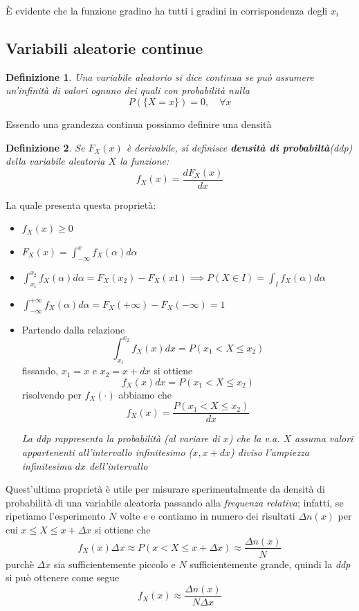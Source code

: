 \documentclass[11pt,a4paper]{article}
\newtheorem{definition}{Definizione}[section]
\begin{document}
È evidente che la funzione gradino ha tutti i gradini in corrispondenza degli $x_i$
\subsection{Variabili aleatorie continue}\label{sub:Variabili aleatorie continue} %
\begin{definition}\label{varabile aleatorio continua}
    Una variabile aleatorio si dice continua se può assumere un'infinità di valori
    ognuno dei quali con probabilità nulla
    \begin{displaymath}
        P(\{X = x\}) = 0, \quad \forall x 
    \end{displaymath}
    
\end{definition}
Essendo una grandezza continua possiamo definire una densità
\begin{definition}\label{densità di probabilità}
   Se $F_X(x)$ è derivabile, si definisce \textbf{densità di probabiltà}(ddp) della 
   variabile aleatoria $X$ la funzione: 
   \begin{displaymath}
       f_X(x) = \frac{dF_X(x)}{dx}
   \end{displaymath}
\end{definition}
La quale presenta questa proprietà:
\begin{itemize}
    \item $f_X(x) \geq 0$ 
    \item $F_X(x) = \int_{-\infty}^x  f_X(\alpha)d\alpha$
    \item $\int_{x_1}^{x_2}f_X(\alpha)d\alpha = F_X(x_2) - F_X(x1) \implies P(X \in I) = \int_I f_X(\alpha)d\alpha$ 
    \item $\int_{-\infty}^{+\infty} f_X(\alpha)d\alpha = F_X(+\infty) - F_X(-\infty) = 1$
    \item Partendo dalla relazione 
        \[
            \int_{x_1}^{x_2}f_X(x)dx = P(x_1 < X \leq x_2)
        \]
        fissando, $x_1=x$ e  $x_2 = x + dx$ si ottiene
        \[
            f_X(x)dx = P(x_1 < X \leq x_2)
        \]
        risolvendo per $f_X(\cdot)$ abbiamo che
        \[
            f_X(x) = \frac{P(x_1 < X \leq x_2)}{dx}
        \]
        \begin{importantbox}
        \textit{La ddp rappresenta la probabilità (al variare di $x$) che la v.a.
        $X$ assuma valori appartenenti all’intervallo infinitesimo ($x, x+dx$)
        diviso l’ampiezza infinitesima $dx$ dell’intervallo}
        \end{importantbox}
\end{itemize}
Quest'ultima proprietà è utile per misurare sperimentalmente da densità di probabilità di 
una variabile aleatoria passando alla \textit{frequenza relativa}; infatti, se ripetiamo l'esperimento
$N$ volte e e contiamo in numero dei risultati $\Delta n(x)$ per cui $x \leq X \leq x + \Delta x$ si ottiene che
\[
    f_X(x)\Delta x \approx P(x < X \leq x + \Delta x) \approx \frac{\Delta n(x)}{N}
\]
purchè $\Delta x$ sia sufficientemente piccolo e $N$ sufficientemente grande,
quindi la \textit{ddp} si può ottenere come segue
\[
    f_X(x) \approx \frac{\Delta n(x)}{N \Delta x} 
\]
\end{document}
